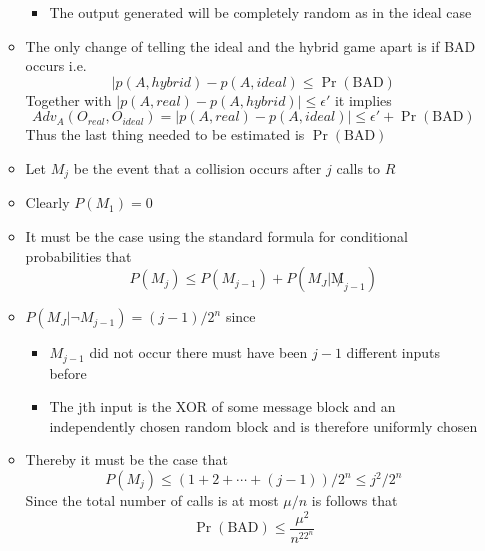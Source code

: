 \begin{itemize}
\begin{itemize}
\begin{itemize}
      \item The output generated will be completely random as in the ideal case
    \end{itemize}
    \item The only change of telling the ideal and the hybrid game apart is if BAD occurs i.e.
    \[
      |p(A,hybrid) - p(A,ideal) \leq \Pr(\text{BAD})
    \]
    Together with $|p(A,real) - p(A, hybrid) | \leq \epsilon'$ it implies
    \[
      Adv_A(O_{real}, O_{ideal}) = |p(A,real) - p(A,ideal) | \leq \epsilon' + \Pr(\text{BAD})
    \]
    Thus the last thing needed to be estimated is $\Pr(\text{BAD})$ 
    \item Let $M_j$ be the event that a collision occurs after $j$ calls to $R$
    \item Clearly $P(M_1) = 0$ 
    \item It must be the case using the standard formula for conditional probabilities that 
    \begin{equation*}
      P(M_j) \leq P(M_{j-1}) + P(M_J | \not M_{j-1})
    \end{equation*}
    \item $P(M_J | \neg M_{j-1}) = (j-1)/2^{n}$ since 
    \begin{itemize}
      \item $M_{j-1}$ did not occur there must have been $j-1$ different inputs before 
      \item The jth input is the XOR of some message block and an independently chosen random block and is therefore uniformly chosen
    \end{itemize}
    \item Thereby it must be the case that
    \begin{equation*}
      P(M_j) \leq (1+2+\cdots + (j-1))/ 2^n \leq j^2/2^n
    \end{equation*}
    Since the total number of calls is at most $\mu /n$ is follows that 
    \begin{equation*}
      \Pr(\text{BAD}) \leq \frac{\mu^2}{n^22^n}
    \end{equation*}
  \end{itemize}

\end{itemize}

